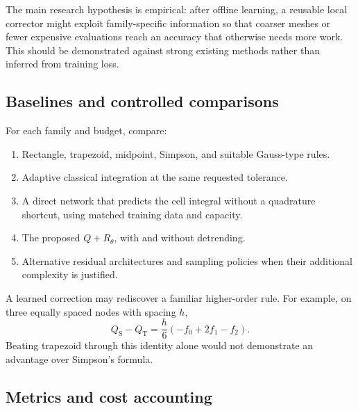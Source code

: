 The main research hypothesis is empirical: after offline learning,
a reusable local corrector might exploit family-specific information so
that coarser meshes or fewer expensive evaluations reach an accuracy that
otherwise needs more work. This should be demonstrated against strong
existing methods rather than inferred from training loss.

\subsection{Baselines and controlled comparisons}

For each family and budget, compare:
\begin{enumerate}
    \item Rectangle, trapezoid, midpoint, Simpson, and suitable
          Gauss-type rules.
    \item Adaptive classical integration at the same requested tolerance.
    \item A direct network that predicts the cell integral without a
          quadrature shortcut, using matched training data and capacity.
    \item The proposed $Q+R_\theta$, with and without detrending.
    \item Alternative residual architectures and sampling policies when
          their additional complexity is justified.
\end{enumerate}
A learned correction may rediscover a familiar higher-order rule.
For example, on three equally spaced nodes with spacing $h$,
\[
    Q_{\mathrm S}-Q_{\mathrm T}
    =\frac h6(-f_0+2f_1-f_2).
\]
Beating trapezoid through this identity alone would not demonstrate
an advantage over Simpson's formula.

\subsection{Metrics and cost accounting}

